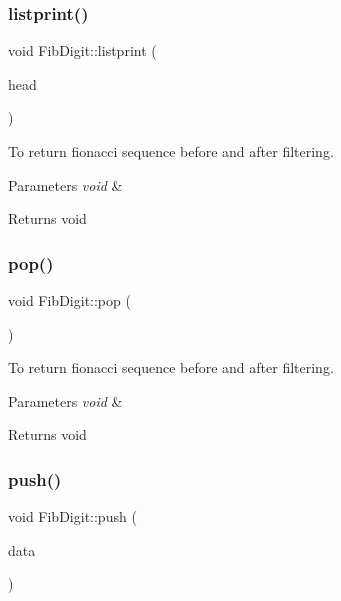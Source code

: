 \subsubsection{\texorpdfstring{listprint()}{listprint()}}
{\footnotesize\ttfamily void Fib\+Digit\+::listprint (\begin{DoxyParamCaption}\item[{\mbox{\hyperlink{structnode}{node}} $\ast$$\ast$}]{head }\end{DoxyParamCaption})\hspace{0.3cm}{\ttfamily [virtual]}}



To return fionacci sequence before and after filtering. 


\begin{DoxyParams}{Parameters}
{\em void} & \\
\hline
\end{DoxyParams}
\begin{DoxyReturn}{Returns}
void 
\end{DoxyReturn}
\mbox{\label{classFibDigit_a378b92b5328d1e0f532f63ce0ee38c37}} 
\subsubsection{\texorpdfstring{pop()}{pop()}}
{\footnotesize\ttfamily void Fib\+Digit\+::pop (\begin{DoxyParamCaption}\item[{void}]{ }\end{DoxyParamCaption})\hspace{0.3cm}{\ttfamily [virtual]}}



To return fionacci sequence before and after filtering. 


\begin{DoxyParams}{Parameters}
{\em void} & \\
\hline
\end{DoxyParams}
\begin{DoxyReturn}{Returns}
void 
\end{DoxyReturn}
\mbox{\label{classFibDigit_a4ff36c80f50d8fa62e6d691e6264b6e5}} 
\subsubsection{\texorpdfstring{push()}{push()}}
{\footnotesize\ttfamily void Fib\+Digit\+::push (\begin{DoxyParamCaption}\item[{unsigned int}]{data }\end{DoxyParamCaption})\hspace{0.3cm}{\ttfamily [virtual]}}



